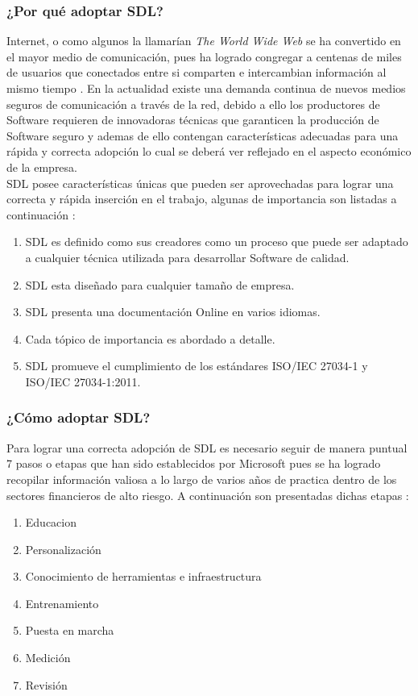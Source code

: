 \documentclass[runningheads,a4paper]{llncs}
\begin{document}
\subsubsection{¿Por qué adoptar \gls{SDL}?}
Internet, o como algunos la llamarían \textit{The World Wide Web} se ha convertido en el mayor medio de comunicación, pues ha logrado congregar a centenas de miles de usuarios que conectados entre si comparten e intercambian información al mismo tiempo \cite{webAplicationSecurity}. En la actualidad existe una demanda continua de nuevos medios seguros de comunicación a través de la red, debido a ello los productores de Software requieren de innovadoras técnicas que garanticen la producción de Software seguro y ademas de ello contengan características adecuadas para una rápida y correcta adopción lo cual se deberá ver reflejado en el aspecto económico de la empresa. \\

\gls{SDL} posee características únicas que pueden ser aprovechadas para lograr una correcta y rápida inserción en el trabajo, algunas de importancia son listadas a continuación \cite{webAplicationSecurity}: 
\begin{enumerate}
	\item \gls{SDL} es definido como sus creadores como un proceso que puede ser adaptado a cualquier técnica utilizada para desarrollar Software de calidad.
	\item  \gls{SDL} esta diseñado para cualquier tamaño de empresa.
	\item \gls{SDL} presenta una documentación \gls{Online} en varios idiomas.
	\item  Cada tópico de importancia es abordado a detalle.
	\item  \gls{SDL} promueve el cumplimiento de los estándares ISO/IEC 27034-1 y ISO/IEC 27034-1:2011.
\end{enumerate}

\subsubsection{¿Cómo adoptar \gls{SDL}?}
Para lograr una correcta adopción de \gls{SDL} es necesario seguir de manera puntual 7 pasos o etapas que han sido establecidos por Microsoft pues se ha logrado recopilar información valiosa a lo largo de varios años de practica dentro de los sectores financieros de alto riesgo. A continuación son presentadas dichas etapas \cite{SDLWhitePaper}: 

\begin{enumerate}
\item Educacion 
\item Personalización 
\item Conocimiento de herramientas e infraestructura 
\item Entrenamiento 
\item Puesta en marcha 
\item Medición 
\item Revisión 
\end{enumerate}
\end{document}
